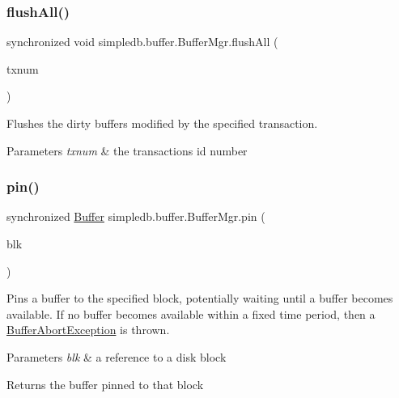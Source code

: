 \subsubsection{\texorpdfstring{flush\+All()}{flushAll()}}
{\footnotesize\ttfamily synchronized void simpledb.\+buffer.\+Buffer\+Mgr.\+flush\+All (\begin{DoxyParamCaption}\item[{int}]{txnum }\end{DoxyParamCaption})\hspace{0.3cm}{\ttfamily [inline]}}

Flushes the dirty buffers modified by the specified transaction. 
\begin{DoxyParams}{Parameters}
{\em txnum} & the transaction\textquotesingle{}s id number \\
\hline
\end{DoxyParams}
\mbox{\label{classsimpledb_1_1buffer_1_1BufferMgr_a8ce62cea253140d8b2faf76059f6808c}} 
\subsubsection{\texorpdfstring{pin()}{pin()}}
{\footnotesize\ttfamily synchronized \hyperlink{classsimpledb_1_1buffer_1_1Buffer}{Buffer} simpledb.\+buffer.\+Buffer\+Mgr.\+pin (\begin{DoxyParamCaption}\item[{\hyperlink{classsimpledb_1_1file_1_1BlockId}{Block\+Id}}]{blk }\end{DoxyParamCaption})\hspace{0.3cm}{\ttfamily [inline]}}

Pins a buffer to the specified block, potentially waiting until a buffer becomes available. If no buffer becomes available within a fixed time period, then a \hyperlink{classsimpledb_1_1buffer_1_1BufferAbortException}{Buffer\+Abort\+Exception} is thrown. 
\begin{DoxyParams}{Parameters}
{\em blk} & a reference to a disk block \\
\hline
\end{DoxyParams}
\begin{DoxyReturn}{Returns}
the buffer pinned to that block 
\end{DoxyReturn}
\mbox{\label{classsimpledb_1_1buffer_1_1BufferMgr_af8cfce0647ac8fbf190908c005bbb49a}} 
